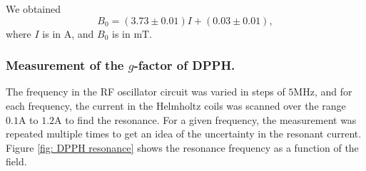 \documentclass[a4paper]{jpconf}
\numberwithin{equation}{section}
\begin{document}
We obtained 
\[
	B_0 = (3.73 \pm 0.01) I + (0.03 \pm 0.01),
\]
where $I$ is in $\si{\ampere}$, and $B_0$ is in $\si{\milli\tesla}$.

\subsubsection{Measurement of the $g$-factor of DPPH.}
The frequency in the RF oscillator circuit was varied in steps of $5 \si{\mega\hertz}$, and for each frequency, the current in the Helmholtz coils was scanned over the range $0.1 \si{\ampere}$ to $1.2 \si{\ampere}$ to find the resonance. For a given frequency, the measurement was repeated multiple times to get an idea of the uncertainty in the resonant current. Figure \ref{fig: DPPH resonance} shows the resonance frequency as a function of the field.
\end{document}
